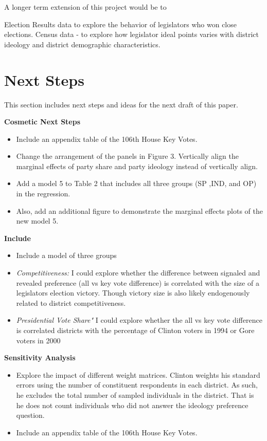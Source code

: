 \documentclass[10pt,letterpaper]{article}
\begin{document}
A longer term extension of this project would be to 

Election Results data to explore the behavior of legislators who won close elections.
Census data - to explore how legislator ideal points varies with district ideology and district demographic characteristics. 

\section{Next Steps} 

This section includes next steps and ideas for the next draft of this paper.

\textbf{Cosmetic Next Steps}
\begin{itemize}
\item Include an appendix table of the 106th House Key Votes.
\item Change the arrangement of the panels in Figure 3. Vertically align the marginal effects of party share and party ideology instead of vertically align.
\item Add a model 5 to Table 2 that includes all three groups (SP ,IND, and OP) in the regression.
\item Also, add an additional figure to demonstrate the marginal effects plots of the new model 5.
\end{itemize}

\textbf{Include}
\begin{itemize}
\item Include a model of three groups
\item \textit{Competitiveness:} I could explore whether the difference between signaled and revealed preference (all vs key vote difference) is correlated with the size of a legislators election victory. Though victory size is also likely endogenously related to district competitiveness.
\item \textit{Presidential Vote Share"} I could explore whether the 
all vs key vote difference is correlated districts with the percentage of Clinton voters in 1994 or Gore voters in 2000 
\end{itemize}

\textbf{Sensitivity Analysis}
\begin{itemize}
\item Explore the impact of different weight matrices. Clinton weights his standard errors using the number of constituent respondents in each district. As such, he excludes the total number of sampled individuals in the district. That is he does not count individuals who did not answer the ideology preference question. 
\item Include an appendix table of the 106th House Key Votes.
\end{itemize}
\end{document}
